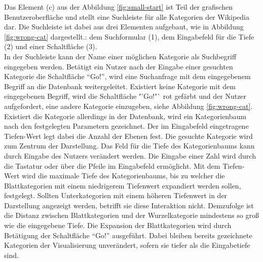 Das Element (c) aus der Abbildung \ref{fig:small-start} ist Teil der grafischen Benutzeroberfläche und stellt eine Suchleiste für alle Kategorien der Wikipedia dar.
Die Suchleiste ist dabei aus drei Elementen aufgebaut, wie in Abbildung \ref{fig:wrong-cat} dargestellt.: dem Suchformular (1), dem Eingabefeld für die Tiefe (2) und einer Schaltfläche (3).\\
In der Suchleiste kann der Name einer möglichen Kategorie als Suchbegriff eingegeben werden.
Betätigt ein Nutzer nach der Eingabe einer gesuchten Kategorie die Schaltfläche "`Go!"', wird eine Suchanfrage mit dem eingegebenem Begriff an die Datenbank weitergeleitet.
Existiert keine Kategorie mit dem eingegebenen Begriff, wird die Schaltfläche "'Go!"` rot gefärbt und der Nutzer aufgefordert, eine andere Kategorie einzugeben, siehe Abbildung \ref{fig:wrong-cat}.
Existiert die Kategorie allerdings in der Datenbank, wird ein Kategorienbaum nach den festgelegten Parametern gezeichnet.
Der im Eingabefeld eingetragene Tiefen-Wert legt dabei die Anzahl der Ebenen fest.
Die gesuchte Kategorie wird zum Zentrum der Darstellung.
Das Feld für die Tiefe des Kategorienbaums kann durch Eingabe des Nutzers verändert werden.
Die Eingabe einer Zahl wird durch die Tastatur oder über die Pfeile im Eingabefeld ermöglicht.
Mit dem Tiefen-Wert wird die maximale Tiefe des Kategorienbaums, bis zu welcher die Blattkategorien mit einem niedrigerem Tiefenwert expandiert werden sollen, festgelegt.
Sollten Unterkategorien mit einem höheren Tiefenwert in der Darstellung angezeigt werden, betrifft sie diese Interaktion nicht.
Demzufolge ist die Distanz zwischen Blattkategorien und der Wurzelkategorie mindestens so groß wie die eingegebene Tiefe.
Die Expansion der Blattkategorien wird durch Betätigung der Schaltfläche "`Go!"' ausgeführt.
Dabei bleiben bereits gezeichnete Kategorien der Visualisierung unverändert, sofern sie tiefer als die Eingabetiefe sind.

